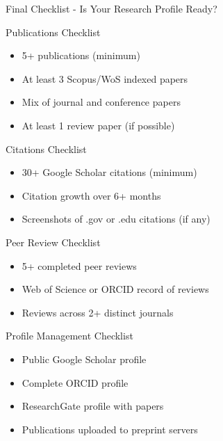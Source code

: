 \documentclass[11pt]{beamer}
\begin{document}
				\begin{frame}{Final Checklist - Is Your Research Profile Ready?}
					\scriptsize
					\begin{block}{Publications Checklist}
						\begin{itemize}
							\item [$\square$] 5+ publications (minimum)
							\item [$\square$] At least 3 Scopus/WoS indexed papers
							\item [$\square$] Mix of journal and conference papers
							\item [$\square$] At least 1 review paper (if possible)
						\end{itemize}
					\end{block}
					\begin{block}{Citations Checklist}
						\begin{itemize}
							\item [$\square$] 30+ Google Scholar citations (minimum)
							\item [$\square$] Citation growth over 6+ months
							\item [$\square$] Screenshots of .gov or .edu citations (if any)
						\end{itemize}
					\end{block}
					\begin{block}{Peer Review Checklist}
						\begin{itemize}
							\item [$\square$] 5+ completed peer reviews
							\item [$\square$] Web of Science or ORCID record of reviews
							\item [$\square$] Reviews across 2+ distinct journals
						\end{itemize}
					\end{block}
					\begin{block}{Profile Management Checklist}
						\begin{itemize}
							\item [$\square$] Public Google Scholar profile
							\item [$\square$] Complete ORCID profile
							\item [$\square$] ResearchGate profile with papers
							\item [$\square$] Publications uploaded to preprint servers
						\end{itemize}
					\end{block}
				\end{frame}
				
\end{document}
